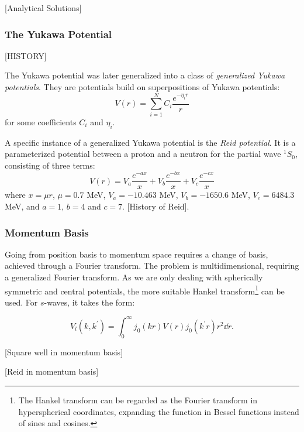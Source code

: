 [Analytical Solutions]


\subsubsection{The Yukawa Potential}
[HISTORY]

The Yukawa potential was later generalized into a class of \textit{generalized
  Yukawa potentials}. They are potentials build on superpositions of Yukawa potentials:
\begin{equation*}
  V(r) = \sum_{i=1}^{N}C_{i}\frac{e^{-\eta_{i}r}}{r}
\end{equation*}
for some coefficients \(C_{i}\) and \(\eta_{i}\).

A specific instance of a generalized Yukawa potential is the \textit{Reid potential}. It
is a parameterized potential between a proton and a neutron for the partial wave
\(^{1}S_{0}\), consisting of three terms:
\begin{equation*}
  V(r) = V_{a}\frac{e^{-ax}}{x} + V_{b}\frac{e^{-bx}}{x} + V_{c}\frac{e^{-cx}}{x}
\end{equation*}
where \(x=\mu r\), \(\mu=0.7\) MeV, \(V_{a}=-10.463\) MeV, \(V_{b}=-1650.6\)
MeV, \(V_{c}=6484.3\) MeV, and \(a=1\), \(b=4\) and \(c=7\).
[History of Reid].

\subsubsection{Momentum Basis}

Going from position basis to momentum space requires a change of basis, achieved
through a Fourier transform. The problem is multidimensional, requiring a
generalized Fourier transform. As we are only dealing with spherically symmetric
and central potentials, the more suitable Hankel transform\footnote{The Hankel
  transform can be regarded as the Fourier transform in hyperspherical coordinates, expanding the function in
Bessel functions instead of sines and cosines. } can be used. For
\(s\)-waves, it takes the form:

\newcommand{\kp}{k^{\prime}}
\begin{equation*}
  V_{l}(k, \kp{}) = \int_{0}^{\infty}j_{0}(kr)V(r)j_{0}(k^{\prime}r)r^{2}\dd r .
\end{equation*}


[Square well in momentum basis]

[Reid in momentum basis]





